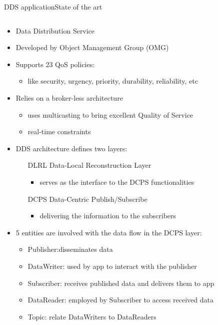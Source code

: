 \begin{frame}{DDS application}{State of the art}
	\begin{columns}
		
		\begin{column}{0.65\textwidth}
		
			\begin{itemize}
				\item Data Distribution Service
				\item Developed by Object Management Group (OMG)
				\item Supports 23 QoS policies:
					\begin{itemize}
						\item like security, urgency, priority, durability, reliability, etc
					\end{itemize}
				\item Relies on a broker-less architecture
					\begin{itemize}
						\item uses multicasting to bring excellent Quality of Service
						\item real-time constraints
					\end{itemize}
				\item DDS architecture defines two layers:
					\begin{itemize}
						\item[DLRL] Data-Local Reconstruction Layer
							\begin{itemize}
								\item serves as the interface to the DCPS functionalities
							\end{itemize}
						\item[DCPS] Data-Centric Publish/Subscribe
							\begin{itemize}
								\item delivering the information to the subscribers
							\end{itemize}
					\end{itemize}
				\item 5 entities are involved with the data flow in the DCPS layer:
					\begin{itemize}
						\item Publisher:disseminates data
						\item DataWriter: used by app to interact with the publisher
						\item Subscriber: receives published data and delivers them to app
						\item DataReader: employed by Subscriber to access received data
						\item Topic: relate DataWriters to DataReaders
					\end{itemize}
			\end{itemize}
			

\end{column}
\end{columns}
\end{frame}
